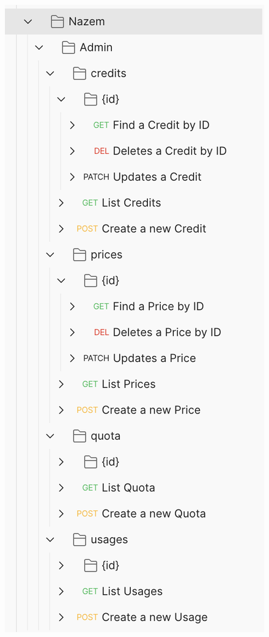 \begin{figure}
	\vspace{1cm}
	\centering
	\begin{minipage}[b]{0.45\textwidth}
		\includegraphics[width=\textwidth]{figures/nazem-api.png}

\end{minipage}
\end{figure}
